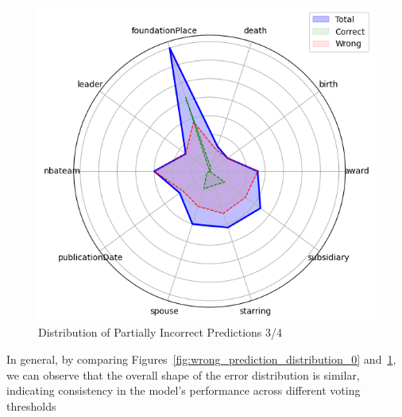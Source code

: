 \begin{figure}[ht!]
\begin{minipage}[b]{0.4\textwidth}
        \includegraphics[width=\textwidth]{res/radar-error-1}
        \caption{Distribution of Partially Incorrect Predictions 3/4}
        \label{fig:wong_prediction_distribution_1}
    \end{minipage}
\end{figure}

In general, by comparing Figures~\ref{fig:wrong_prediction_distribution_0} and~\ref{fig:wong_prediction_distribution_1}, we can observe that the overall shape of the error distribution is similar, indicating consistency in the model's performance across different voting thresholds